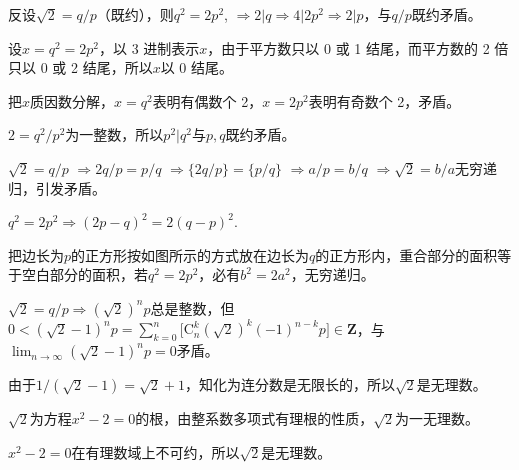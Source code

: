 \documentclass{article}
\begin{document}
\newcommand\proof[1]{\par\vspace*{1em}{\large\bf#1}\par}
\proof{证明$\mathbf{\sqrt2}$是无理数之整除}
反设$\sqrt2=q/p$（既约），则$q^2=2p^2$, $\Rightarrow 2|q \Rightarrow 4|2p^2 \Rightarrow 2|p$，与$q/p$既约矛盾。

\proof{3 进制表示}
设$x=q^2=2p^2$，以 3 进制表示$x$，由于平方数只以 0 或 1 结尾，而平方数的 2 倍只以 0 或 2 结尾，所以$x$以 0 结尾。

\proof{算术基本定理}
把$x$质因数分解，$x=q^2$表明有偶数个 2，$x=2p^2$表明有奇数个 2，矛盾。

\proof{平方为整数}
$2=q^2/p^2$为一整数，所以$p^2|q^2$与$p,q$既约矛盾。

\proof{取出小数部分}
$\sqrt2=q/p$ $\Rightarrow 2q/p=p/q$ $\Rightarrow \{2q/p\}=\{p/q\}$ $\Rightarrow a/p=b/q$ $\Rightarrow \sqrt2=b/a$无穷递归，引发矛盾。

\proof{又一个无穷递归}
$q^2=2p^2 \Rightarrow (2p-q)^2=2(q-p)^2$.

\proof{图形上的无穷递归}
\begin{minipage}{\textwidth}\begin{minipage}{0.6\textwidth}
把边长为$p$的正方形按如图所示的方式放在边长为$q$的正方形内，重合部分的面积等于空白部分的面积，若$q^2=2p^2$，必有$b^2=2a^2$，无穷递归。
\end{minipage}\quad\begin{minipage}{0.4\textwidth}
\end{minipage}\end{minipage}

\proof{运用极限}
\def\Crm{\mathrm{C}}\def\Zbf{\mathbf{Z}}
$\sqrt2=q/p \Rightarrow (\sqrt2)^np$总是整数，但$0<(\sqrt2-1)^np=\displaystyle\sum_{k=0}^n\big[\Crm_n^k(\sqrt2)^k(-1)^{n-k}p\big]\in\Zbf$，与$\displaystyle\lim_{n\to\infty}(\sqrt2-1)^np=0$矛盾。

\proof{连分数}
由于$1/(\sqrt2-1)=\sqrt2+1$，知化为连分数是无限长的，所以$\sqrt2$是无理数。

\proof{整系数多项式}
$\sqrt2$为方程$x^2-2=0$的根，由整系数多项式有理根的性质，$\sqrt2$为一无理数。

\proof{艾森斯坦判别法}
$x^2-2=0$在有理数域上不可约，所以$\sqrt2$是无理数。
\end{document}
